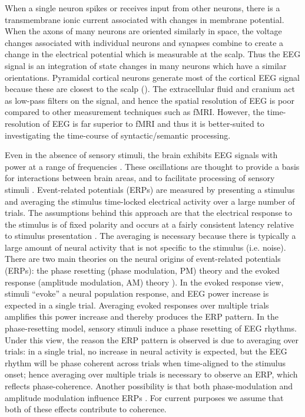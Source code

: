 When a single neuron spikes or receives input from other neurons, there is a transmembrane ionic current associated with changes in membrane potential. When the axons of many neurons are oriented similarly in space, the voltage changes associated with individual neurons and synapses combine to create a change in the electrical potential which is measurable at the scalp. Thus the EEG signal is an integration of state changes in many neurons which have a similar orientations. Pyramidal cortical neurons generate most of the cortical EEG signal because these are closest to the scalp (\citealt{FedermeierLaszlo2009,KutasDale1997}). The extracellular fluid and cranium act as low-pass filters on the signal, and hence the spatial resolution of EEG is poor compared to other measurement techniques such as fMRI. However, the time-resolution of EEG is far superior to fMRI and thus it is better-suited to investigating the time-course of syntactic/semantic processing. 

Even in the absence of sensory stimuli, the brain exhibits EEG signals with power at a range of frequencies \citep{Buzsaki2006}. These oscillations are thought to provide a basis for interactions between brain areas, and to facilitate processing of sensory stimuli \citep{FriesEtAl2001,GrayEtAl1989}. Event-related potentials (ERPs) are measured by presenting a stimulus and averaging the stimulus time-locked electrical activity over a large number of trials. The assumptions behind this approach are that the electrical response to the stimulus is of fixed polarity and occurs at a fairly consistent latency relative to stimulus presentation \citep{PennyEtAl2002}. The averaging is necessary because there is typically a large amount of neural activity that is not specific to the stimulus (i.e. noise). There are two main theories on the neural origins of event-related potentials (ERPs): the phase resetting (phase modulation, PM) theory and the evoked response (amplitude modulation, AM) theory \citep{MakeigEtAl2002,PennyEtAl2002,ShahEtAl2004}). In the evoked response view, stimuli “evoke” a neural population response, and EEG power increase is expected in a single trial. Averaging evoked responses over multiple trials amplifies this power increase and thereby produces the ERP pattern. In the phase-resetting model, sensory stimuli induce a phase resetting of EEG rhythms. Under this view, the reason the ERP pattern is observed is due to averaging over trials: in a single trial, no increase in neural activity is expected, but the EEG rhythm will be phase coherent across trials when time-aligned to the stimulus onset; hence averaging over multiple trials is necessary to observe an ERP, which reflects phase-coherence. Another possibility is that both phase-modulation and amplitude modulation influence ERPs \citep{PennyEtAl2004,ShahEtAl2002}. For current purposes we assume that both of these effects contribute to coherence. 

